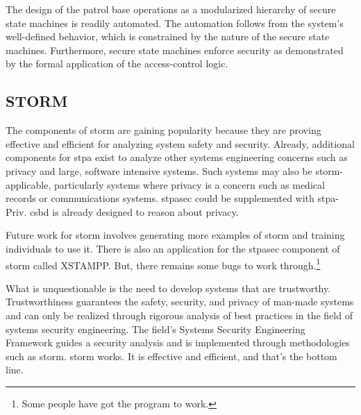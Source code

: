 \documentclass[../../main/main.tex]{subfiles}
\begin{document}
The design of the patrol base operations as a modularized hierarchy of secure state machines is readily automated. The automation follows from the system's well-defined behavior, which is constrained by the nature of the secure state machines.  Furthermore, secure state machines enforce security as demonstrated by the formal application of the access-control logic.

\subsection{STORM}\label{sec:futurestorm}
The components of \gls{storm} are gaining popularity because they are proving effective and efficient for analyzing system safety and security.  Already, additional components for \gls{stpa} exist to analyze other systems engineering concerns such as privacy and large, software intensive systems.  Such systems may also be \gls{storm}-applicable, particularly systems where privacy is a concern such as medical records or communications systems.  \gls{stpasec} could be supplemented with \gls{stpa}-Priv.   \gls{csbd} is already designed to reason about privacy.

Future work for \gls{storm} involves generating more examples of \gls{storm} and training individuals to use it.  There is also an application for the \gls{stpasec} component of \gls{storm} called XSTAMPP.  But, there remains some bugs to work through.\footnote{Some people have got the program to work.}




What is unquestionable is the need to develop systems that are trustworthy.   Trustworthiness guarantees the safety, security, and privacy of man-made systems and can only be realized through rigorous analysis of best practices in the field of systems security engineering.  The  field's Systems Security Engineering Framework guides a security analysis and is implemented through methodologies such as  \gls{storm}.  \gls{storm} works.  It is effective and efficient, and that's the bottom line.


\end{document}
